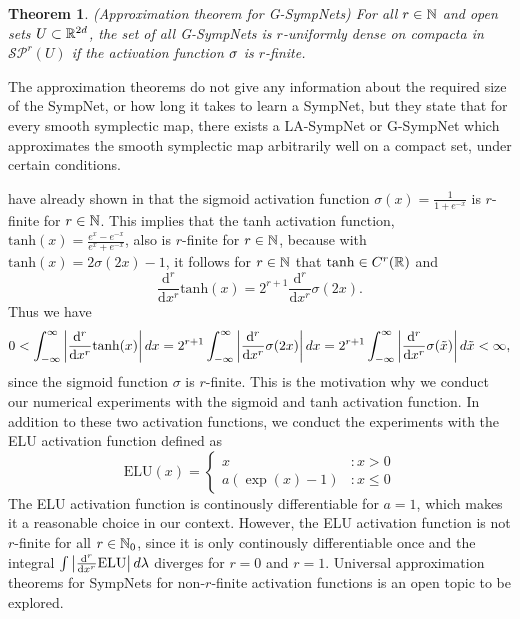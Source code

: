 \documentclass[twoside,a4paper]{article}
\newtheorem{theorem}{Theorem}
\begin{document}
\begin{theorem}
	(Approximation theorem for G-SympNets)
	For all $r \in \mathbb{N}$ and open sets $U \subset \mathbb{R}^{2d}$, the set of all G-SympNets
	is $r$-uniformly dense on compacta in $\mathcal{S}\mathcal{P}^r(U)$ if the activation function
	$\sigma$ is $r$-finite.
\end{theorem}

The approximation theorems do not give any information
about the required size of the SympNet, or how long it takes to learn a SympNet,
but they state that for every smooth symplectic map, there exists a LA-SympNet or G-SympNet
which approximates the smooth symplectic map arbitrarily well on a compact set,
under certain conditions.

\citeauthor{Jin2020} have already shown in \cite[Lemma 1]{Jin2020} that the
sigmoid activation function $\sigma(x) = \frac{1}{1+e^{-x}}$
is $r$-finite for $r \in \mathbb{N}$. This implies that the tanh activation function,
$\mathrm{tanh}(x) = \frac{e^x - e^{-x}}{e^x + e^{-x}}$,
also is $r$-finite for $r \in \mathbb{N}$, 
because with $\mathrm{tanh}(x) = 2\sigma(2x) - 1$, it follows for $r \in \mathbb{N}$
that $\mathrm{tanh} \in C^r(\mathbb{R})$ and
\begin{equation*}
	\frac{\mathrm{d}^r}{\mathrm{d}x^r} \mathrm{tanh}(x) = 
	2^{r+1} \frac{\mathrm{d}^r}{\mathrm{d}x^r} \sigma(2x)
	.
\end{equation*}
Thus we have
\begin{equation*}
	0 < \int_{- \infty}^{\infty} \left|{\frac{\mathrm{d}^r}{\mathrm{d}x^r} \mathrm{tanh}(x)}\right| dx
	= 2^{r+1} \int_{- \infty}^{\infty} \left|{\frac{\mathrm{d}^r}{\mathrm{d}x^r} \sigma(2x)}\right| dx
	= 2^{r+1} \int_{- \infty}^{\infty} \left|{\frac{\mathrm{d}^r}{\mathrm{d}x^r} \sigma(\tilde{x})}\right| d\tilde{x}
	< \infty
	,
\end{equation*}
since the sigmoid function $\sigma$ is $r$-finite. This is the motivation why we conduct
our numerical experiments with the sigmoid and tanh activation function. In addition to
these two activation functions, we conduct the experiments with the ELU activation function defined as
\begin{equation*}
	\mathrm{ELU}(x) = \begin{cases}
		x &: x > 0 \\
		a (\exp(x) - 1) &: x \leq 0
	\end{cases}
\end{equation*}
The ELU activation function is continously differentiable for $a=1$,
which makes it a reasonable choice in our context. However, 
the ELU activation function is not $r$-finite for all $r \in \mathbb{N}_0$, since
it is only continously differentiable once and the integral 
$\int \left|{\frac{\mathrm{d}^r}{\mathrm{d}x^r} \mathrm{ELU}}\right| d\lambda$
diverges for $r=0$ and $r=1$. Universal approximation theorems for SympNets
for non-$r$-finite activation functions is an open topic to be explored.
\end{document}
